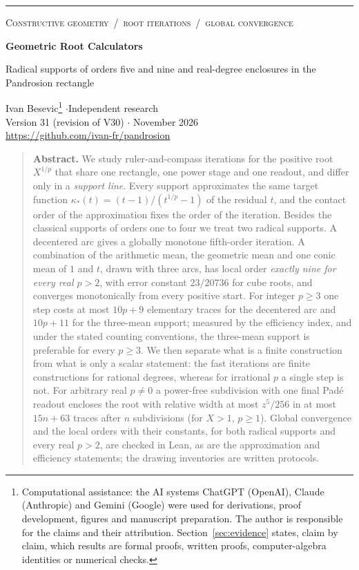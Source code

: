 \documentclass[10pt,a4paper]{article}
\theoremstyle{plain}
\theoremstyle{remark}
\numberwithin{equation}{section}
\begin{document}
\noindent\textcolor{supp}{\rule{\linewidth}{1.6pt}}
\vspace{4pt}

{\small\scshape\textcolor{slatec}{Constructive geometry \,/\, root iterations \,/\, global convergence}}

\vspace{5pt}
{\LARGE\bfseries\textcolor{ink}{Geometric Root Calculators}\par}
\vspace{3pt}
{\large\raggedright\textcolor{ink!85}{Radical supports of orders five and nine and real-degree enclosures in the Pandrosion rectangle}\par}
\vspace{8pt}
Ivan Besevic\footnote{Computational assistance: the AI systems ChatGPT (OpenAI), Claude (Anthropic) and Gemini (Google) were used for derivations, proof development,
figures and manuscript preparation. The author is responsible for the claims and their attribution.
Section~\ref{sec:evidence} states, claim by claim, which results are formal proofs, written proofs,
computer-algebra identities or numerical checks.}
\quad$\cdot$\quad Independent research\\
Version 31 (revision of V30) \quad$\cdot$ November 2026\\
\url{https://github.com/ivan-fr/pandrosion}

\vspace{6pt}
\begin{quote}\small
\textbf{Abstract.}
We study ruler-and-compass iterations for the positive root $X^{1/p}$ that share one rectangle, one
power stage and one readout, and differ only in a \emph{support line}. Every support approximates the
same target function $\kappa_*(t)=(t-1)/(t^{1/p}-1)$ of the residual $t$, and the contact order of the
approximation fixes the order of the iteration. Besides the classical supports of orders one to four we
treat two radical supports. A decentered arc gives a globally monotone fifth-order iteration. A
combination of the arithmetic mean, the geometric mean and one conic mean of $1$ and $t$, drawn with three
arcs, has local order \emph{exactly nine for every real $p>2$}, with error constant $23/20736$ for cube
roots, and converges monotonically from every positive start. For integer $p\ge 3$ one step costs at
most $10p+9$ elementary traces for the decentered arc and $10p+11$ for the three-mean support; measured
by the efficiency index, and under the stated counting conventions, the three-mean support is preferable
for every $p\ge3$. We then separate what is a finite construction from what is only a scalar statement:
the fast iterations are finite constructions for rational degrees, whereas for irrational $p$ a single
step is not. For arbitrary real $p\neq 0$ a power-free subdivision with one final Pad\'e readout encloses
the root with relative width at most $z^5/256$ in at most $15n+63$ traces after $n$ subdivisions (for
$X>1$, $p\ge 1$). Global convergence and the local orders with their constants, for both radical
supports and every real $p>2$, are checked in Lean, as are the approximation and efficiency statements;
the drawing inventories are written protocols.
\end{quote}
\end{document}
